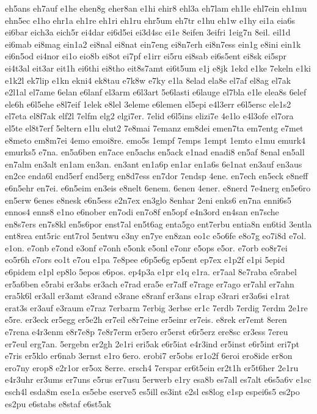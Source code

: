 {eh5ans
eh7auf
e1he
ehen8g
eher8an
e1hi
ehir8
ehl3a
eh7lam
eh1le
ehl7ein
eh1mu
ehn5ec
e1ho
ehr1a
eh1re
eh1ri
eh1ru
ehr5um
eh7tr
e1hu
eh1w
e1hy
ei1a
eia6s
ei6bar
eich3a
eich5r
ei4dar
ei6d5ei
ei3d4sc
ei1e
8eifen
3eifri
1eig7n
8eil.
eil1d
ei6mab
ei8mag
ein1a2
ei8nal
ei8nat
ein7eng
ei8n7erh
ei8n7ess
ein1g
e8ini
ein1k
ei6n5od
ei4nor
ei1o
eio8b
ei8ot
ei7pf
e1irr
ei5ru
ei8sab
ei6s5ent
ei8sk
ei5spr
ei4t3al
eit3ar
eit1h
ei6thi
ei8tho
eit8s7amt
ei6t5um
e1j
e8jk
1ekd
e1ke
7ekeln
e1ki
e1k2l
ek7lip
e1kn
ekni4
ek8tau
e7k8w
e7ky
e1la
8elad
ela8e
el7af
el8ag
el7ak
e2l1al
el7ame
6elan
e6lanf
el3arm
e6l3art
5e6lasti
e6lauge
el7bla
e1le
elea8s
6elef
ele6h
e6l5ehe
e8l7eif
1elek
e8lel
3eleme
e6lemen
el5epi
e4l3err
e6l5ersc
ele1s2
el7eta
el8f7ak
elf2l
7elfm
elg2
elgi7er.
7elid
e6l5ins
elizi7e
4e1lo
e4l3ofe
el7ora
el5te
el8t7erf
5eltern
e1lu
elut2
7e8mai
7emanz
em8dei
emen7ta
em7entg
e7met
e8meto
em8m7ei
4emo
emoi8re.
emo5s
1empf
7emps
1empt
1emto
e1mu
emurk4
emurks5
e7na.
en5a6ben
en7ace
en5achs
en5ack
e1nad
enadi8
en5af
8enal
en5all
en7alm
en3alt
en1am
en3an.
en3ant
en1a6p
en1ar
en1a6s
6e1nat
en3auf
en3aus
en2ce
enda6l
end5erf
end5erg
en8d7ess
en7dor
7endsp
4ene.
en7ech
en5eck
e8neff
e6n5ehr
en7ei.
e6n5eim
en3eis
e8nelt
6enem.
6enen
4ener.
e8nerd
7e4nerg
en5e6ro
en5erw
6enes
e8nesk
e6n5ess
e2n7ex
en3glo
8enhar
2eni
enks6
en7na
enni6s5
ennos4
enns8
e1no
e6nober
en7odi
en7o8f
en5opf
e4n3ord
en4san
en7sche
en8s7ers
en7s8kl
en5s6por
enst7al
en5t6ag
enta5go
ent7erbu
entia8n
en6tid
3entla
ent8rea
ent5ric
ent7rol
5entwu
e3ny
en7ye
en8zan
eo1c
e5o6fe
e8o7g
eo7i8d
e7ol.
e1on.
e7onb
e7ond
e3onf
e7onh
e5onk
e5onl
e7onr
e5ops
e5or.
e7orb
eo8r7ei
eo5r6h
e7ors
eo1t
e7ou
e1pa
7e8pee
e6p5e6g
ep5ent
ep7ex
e1p2f
e1pi
5epid
e6pidem
e1pl
ep8lo
5epos
e6pos.
ep4p3a
e1pr
e1q
e1ra.
er7aal
8e7raba
e5rabel
er5a6ben
e5rabi
er3abs
er3ach
e7rad
era5e
er7aff
e7rage
er7ago
er7ahl
er7ahn
era5k6l
er3all
er3amt
e3rand
e3rane
e8ranf
er3ans
e1rap
e3rari
er3a6si
e1rat
erat3s
er3auf
e3raum
e7raz
7erbarm
7erbig
3erbse
er1c
7erdb
7erdig
7erdm
2e1re
e5re.
er3eck
er5egg
er5e2h
er7eil
e8r7eine
er5einr
er7eis.
e8rek
er7emt
8eren
e7rena
e4r3enm
e8r7e8p
7e8r7erm
er5ero
er5erst
e6r5erz
ere8sc
er3ess
7ereu
er7eul
erg7an.
5ergebn
er2gh
2e1ri
eri5ak
e6r5iat
e4r3ind
er5inst
e6r5int
eri7pt
e7ris
er5klo
er6nab
3ernst
e1ro
6ero.
erobi7
er5obs
er1o2f
6eroi
ero8ide
er8on
ero7ny
erop8
e2r1or
er5ox
8erre.
ersch4
7erspar
er6t5ein
er2t1h
er5t6her
2e1ru
e4r3uhr
er3ums
er7uns
e5rus
er7usu
5erwerb
e1ry
esa8b
es7all
es7alt
e6s5a6v
e1sc
esch4l
esda8m
ese1a
es5ebe
eserve5
es5ill
es3int
e2sl
es8log
e1sp
espei6s5
es2po
es2pu
e6stabs
e8staf
e6st5ak
}
